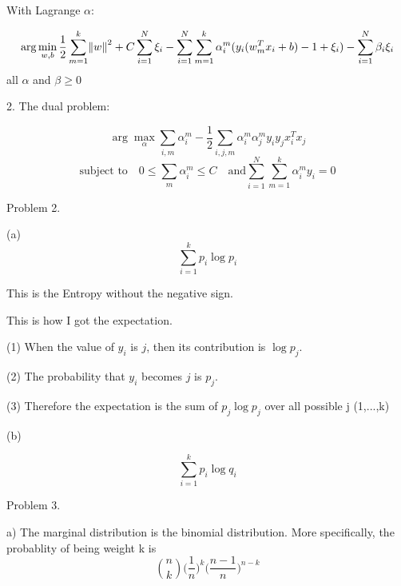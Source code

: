 \documentclass[11pt]{article}
\theoremstyle{definition}
\begin{document}
With Lagrange $\alpha$:

\begin{equation*}
\arg \min_{w,b} \frac{1}{2} \sum_{m=1}^{k} \norm{w}^2 + C \sum_{i=1}^{N}\xi_i
- \sum_{i=1}^{N}\sum_{m=1}^{k}\alpha_{i}^{m}(y_i(w_m^T x_i + b) -1 + \xi_i)
- \sum_{i=1}^{N}\beta_i\xi_i
\end{equation*}
all $\alpha$ and $\beta \ge 0$

\bigskip


2. The dual problem:

\begin{equation*}
\arg \max_\alpha \sum_{i,m} \alpha_{i}^{m} - \frac{1}{2} \sum_{i,j,m} \alpha_{i}^{m} \alpha_{j}^{m} y_i y_j x_i^T x_j
\end{equation*}
\begin{equation*}
\text{subject to} \quad 0 \le \sum_{m}\alpha_{i}^{m} \le C \quad \text{and} \sum_{i=1}^{N}\sum_{m=1}^{k} \alpha_{i}^{m} y_i =0 
\end{equation*}

\pagebreak

Problem 2.

\bigskip

(a)
\begin{equation*}
\sum_{i=1}^{k}p_i \log p_i
\end{equation*}


This is the Entropy without the negative sign.

This is how I got the expectation.

(1) When the value of $y_i$ is $j$, then its contribution is $\log p_j$.

(2) The probability that $y_i$ becomes $j$ is $p_j$.

(3) Therefore the expectation is the sum of $p_j \log p_j$ over all possible j (1,...,k)

\bigskip
(b)

\begin{equation*}
\sum_{i=1}^{k}p_i \log q_i
\end{equation*}

\bigskip

\pagebreak

Problem 3.

\bigskip
a) The marginal distribution is the binomial distribution. More specifically, the probablity of being weight k is
\begin{equation*}
\binom{n}{k}  \Big(\frac{1}{n}\Big)^k \Big({\frac {n-1}{n}}\Big)^{n-k}
\end{equation*}
\end{document}
